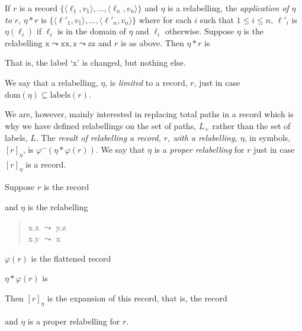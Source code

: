 If $r$ is a record
$\{\langle\ell_1,v_1\rangle,\ldots,\langle\ell_n,v_n\rangle\}$ and
$\eta$ is a relabelling, the \textit{application of $\eta$ to $r$},
$\eta*r$ is
$\{\langle\ell'_1,v_1\rangle,\ldots,\langle\ell'_n,v_n\rangle\}$ where
for each $i$ such that $1\leq i\leq n$, $\ell'_i$ is $\eta(\ell_i)$ if
$\ell_i$ is in the domain of $\eta$ and $\ell_i$ otherwise.  Suppose
$\eta$ is the relabelling $\mathrm{x}\leadsto\mathrm{xx},
\mathrm{z}\leadsto\mathrm{zz}$ and $r$ is as above.  Then $\eta*r$ is
\begin{quote}
\end{quote}
That is, the label `x' is changed, but nothing else.

We say that a relabelling, $\eta$, is \textit{limited} to a record,
$r$, just in case $\mathrm{dom}(\eta)\subseteq\mathrm{labels}(r)$.

We are, however, mainly interested in replacing total paths in a
record which is why we have defined relabellings on the set of paths,
$L_+$ rather than the set of labels, $L$.  The \textit{result of
  relabelling a record, $r$, with a relabelling, $\eta$}, in symbols,
$[r]_\eta$, is $\varphi^-(\eta*\varphi(r))$.  We say that $\eta$ is a
\textit{proper relabelling} for $r$ just in case $[r]_\eta$ is a
record.

Suppose $r$ is the record
\begin{quote}
\end{quote}
and $\eta$ is the relabelling
\begin{quote}
x.x $\leadsto$ y.z\\
x.y $\leadsto$ x\\
\end{quote}
$\varphi(r)$ is the flattened record
\begin{quote}
\end{quote}
$\eta*\varphi(r)$ is
\begin{quote}
\end{quote}
Then $[r]_\eta$ is the expansion of this record, that is, the record
\begin{quote}
\end{quote}
and $\eta$ is a proper relabelling for $r$.  

